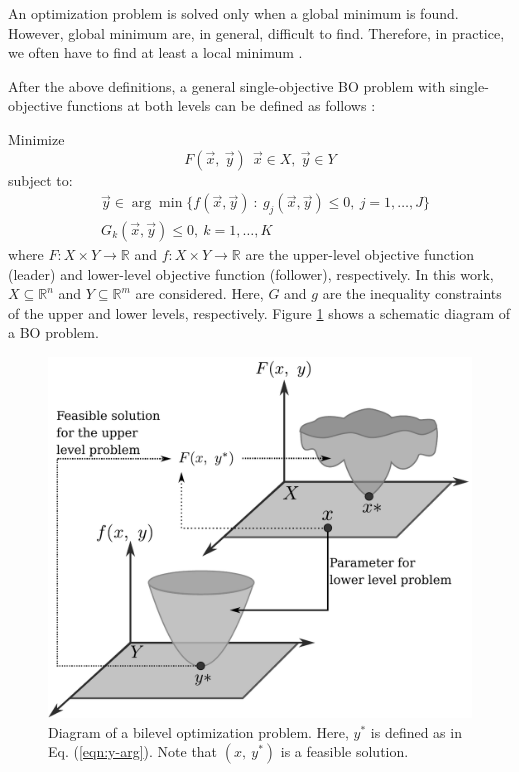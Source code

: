 \documentclass[conference]{IEEEtran}
\begin{document}
An optimization problem is solved only when a global minimum
is found. However, global minimum are, in general, difficult to find. Therefore,
in practice, we often have to find at least a local minimum \cite{rao2009engineering,back}.


After the above definitions, a general single-objective BO problem with single-objective
functions at both levels can be defined as follows \cite{bard2013practical,dempe2002foundations}:

\noindent
Minimize
\begin{equation}
    F(\vec{x},\ \vec{y}) \ \ \vec{x} \in X , \ \vec{y} \in Y 
    \label{eqn:minF1}
\end{equation}
% 
subject to:
% 
\begin{align}
    \label{eqn:y-arg}
    &\vec{y} \in \arg \min \{ f(\vec{x}, \vec{y}) \ : \ g_j(\vec{x}, \vec{y}) \leq 0, \ j = 1,\ldots, J \}\\
    &G_k(\vec{x}, \vec{y})  \leq 0, \ k = 1,\ldots,K
    \label{eqn:G}
\end{align}
where $F: X \times Y \to \mathbb{R}$ and $f: X \times Y \to \mathbb{R}$
are the upper-level objective function (leader) and lower-level objective function
(follower), respectively. In this work, $X \subseteq \mathbb{R}^n$ and
$Y \subseteq \mathbb{R}^m$ are considered. Here, $G$ and $g$ are the inequality
constraints of the upper and lower levels, respectively. Figure \ref{fig:bilevel}
shows a schematic diagram of a BO problem.
% 
\begin{figure}[!ht]
    \centering
    \includegraphics[width=0.8\linewidth]{img/bilevel.pdf}
    \caption{Diagram of a bilevel optimization problem. Here, $y^*$ 
            is defined as in Eq. (\ref{eqn:y-arg}). Note that $(x,\ y^*)$
            is a feasible solution.}
    \label{fig:bilevel}
\end{figure}
\end{document}
